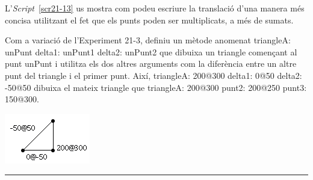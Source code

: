 L'\emph{Script}~\ref{scr21-13} us mostra com podeu escriure la translació d'una manera més concisa utilitzant el fet que els punts poden ser multiplicats, a més de sumats.


\begin{center}
\colorbox{black}{}
\end{center}
{\small
\noindent
Com a variació de l'Experiment 21-3, definiu un mètode anomenat \textsf{triangleA: unPunt delta1: unPunt1 delta2: unPunt2} que dibuixa un triangle començant al punt \textsf{unPunt} i utilitza els dos altres arguments com la diferència entre un altre punt del triangle i el primer punt. Així, \textsf{triangleA: 200@300 delta1: 0@50 delta2: -50@50} dibuixa el mateix triangle que \textsf{\upshape triangleA: 200@300 punt2: 200@250 punt3: 150@300}.}
\begin{center}
\includegraphics[scale=1]{Imatges/figuraE21-4.png} 
\end{center}
\noindent
\rule{\textwidth}{3pt}

